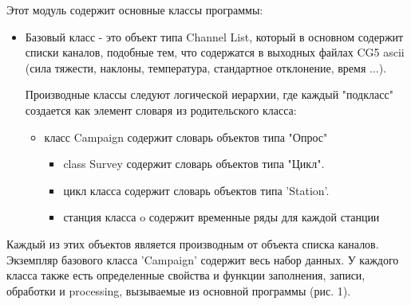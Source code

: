 Этот модуль содержит основные классы программы:
\begin{itemize}
    \item Базовый класс - это объект типа Channel List, который в основном
    содержит списки каналов, подобные тем, что содержатся в выходных файлах CG5
    ascii (сила тяжести, наклоны, температура, стандартное отклонение, время
    ...).

    Производные классы следуют логической иерархии, где каждый "подкласс"
    создается как элемент словаря из родительского класса:
    \begin{itemize}
        \item класс Campaign содержит словарь объектов типа "Опрос"
        \begin{itemize}
            \item class Survey содержит словарь объектов типа "Цикл".
                \item цикл класса содержит словарь объектов типа 'Station'.
                    \item станция класса o содержит временные ряды для каждой станции
        \end{itemize}
    \end{itemize}
    
\end{itemize}

Каждый из этих объектов является производным от объекта списка каналов.
Экземпляр базового класса 'Campaign' содержит весь набор данных. У каждого
класса также есть определенные свойства и функции заполнения, записи, обработки
и processing, вызываемые из основной программы (рис. 1).

